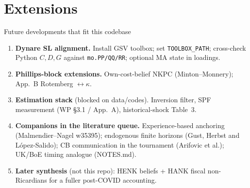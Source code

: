 \documentclass[11pt,aspectratio=169]{beamer}
\begin{document}
\section{Extensions}
\begin{frame}{Future developments that fit this codebase}
  \begin{enumerate}
    \item \textbf{Dynare SL alignment.}
          Install GSV toolbox; set \texttt{TOOLBOX\_PATH}; cross-check
          Python $C,D,G$ against \texttt{mo.PP/QQ/RR}; optional MA state
          in loadings.
    \item \textbf{Phillips-block extensions.}
          Own-cost-belief NKPC (Minton--Monnery); App.~B Rotemberg
          $\leftrightarrow\kappa$.
    \item \textbf{Estimation stack} (blocked on data/codes).
          Inversion filter, SPF measurement (WP \S3.1 / App.~A),
          historical-shock Table~3.
    \item \textbf{Companions in the literature queue.}
          Experience-based anchoring (Malmendier--Nagel w35395);
          endogenous finite horizons (Gust, Herbst and L\'opez-Salido);
          CB communication in the tournament (Arifovic et al.);
          UK/BoE timing analogue (NOTES.md).
    \item \textbf{Later synthesis} (not this repo): HENK beliefs + HANK
          fiscal non-Ricardians for a fuller post-COVID accounting.
  \end{enumerate}
\end{frame}
\end{document}
